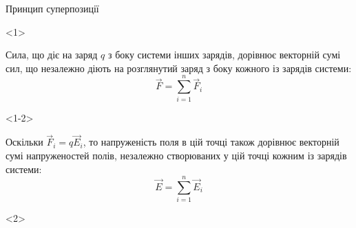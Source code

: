 \documentclass{beamer}
\begin{document}
\begin{frame}{Принцип суперпозиції}{}

	\begin{onlyenv}
		\begin{block}{}\justifying
			Сила, що діє на заряд $q$ з боку системи інших зарядів, дорівнює
			векторній сумі сил, що незалежно діють на розглянутий заряд з боку
			кожного із зарядів системи:
			\begin{equation*}
				\vec{F} = \sum_{i=1}^{n} \vec{F}_i
			\end{equation*}
		\end{block}
	\end{onlyenv}

	\begin{onlyenv}<1-2>
		\begin{block}{}\justifying
			Оскільки $\vec{F}_i = q\vec{E}_i$, то напруженість поля в цій точці
			також
			дорівнює векторній сумі напруженостей полів, незалежно створюваних
			у цій точці кожним із зарядів системи:
			\begin{equation*}
				\vec{E} = \sum_{i=1}^{n} \vec{E}_i
			\end{equation*}
		\end{block}
	\end{onlyenv}

	\begin{onlyenv}
		\begin{center}
			
		\end{center}
	\end{onlyenv}
\end{frame}
\end{document}
